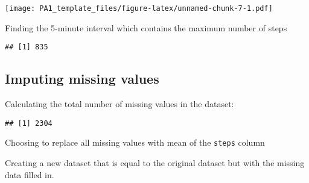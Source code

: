 \documentclass[
]{article}
\newenvironment{Shaded}{\begin{snugshade}}{\end{snugshade}}
\newcommand{\AttributeTok}[1]{\textcolor[rgb]{0.77,0.63,0.00}{#1}}
\newcommand{\CommentTok}[1]{\textcolor[rgb]{0.56,0.35,0.01}{\textit{#1}}}
\newcommand{\ConstantTok}[1]{\textcolor[rgb]{0.00,0.00,0.00}{#1}}
\newcommand{\FunctionTok}[1]{\textcolor[rgb]{0.00,0.00,0.00}{#1}}
\newcommand{\NormalTok}[1]{#1}
\newcommand{\OtherTok}[1]{\textcolor[rgb]{0.56,0.35,0.01}{#1}}
\newcommand{\SpecialCharTok}[1]{\textcolor[rgb]{0.00,0.00,0.00}{#1}}
\newcommand{\StringTok}[1]{\textcolor[rgb]{0.31,0.60,0.02}{#1}}
\begin{document}
\texttt{[image: PA1\_template\_files/figure-latex/unnamed-chunk-7-1.pdf]}

Finding the 5-minute interval which contains the maximum number of steps

\begin{Shaded}
\end{Shaded}

\begin{verbatim}
## [1] 835
\end{verbatim}

\hypertarget{imputing-missing-values}{%
\subsection{Imputing missing values}\label{imputing-missing-values}}

Calculating the total number of missing values in the dataset:

\begin{Shaded}
\end{Shaded}

\begin{verbatim}
## [1] 2304
\end{verbatim}

Choosing to replace all missing values with mean of the \texttt{steps}
column

\begin{Shaded}
\end{Shaded}

Creating a new dataset that is equal to the original dataset but with
the missing data filled in.
\end{document}
